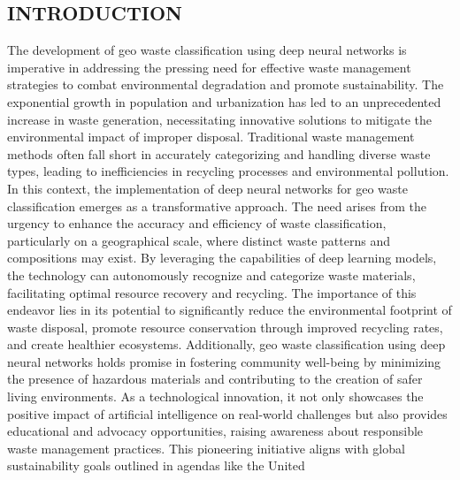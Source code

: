 \documentclass[12pt, English]{article}
\begin{document}
\newpage

\pagestyle{fancy}
\fancyfoot[R]{\footnotesize\thepage}

\begin{center}
\section{\Large INTRODUCTION}
\end{center}
\begin{normalsize}

The development of geo waste classification using deep neural networks is imperative in addressing the pressing need for effective waste management strategies
to combat environmental degradation and promote sustainability. The exponential growth in population and urbanization has led to an unprecedented increase in
waste generation, necessitating innovative solutions to mitigate the environmental
impact of improper disposal. Traditional waste management methods often fall
short in accurately categorizing and handling diverse waste types, leading to inefficiencies in recycling processes and environmental pollution. In this context, the
implementation of deep neural networks for geo waste classification emerges as
a transformative approach. The need arises from the urgency to enhance the accuracy and efficiency of waste classification, particularly on a geographical scale,
where distinct waste patterns and compositions may exist. By leveraging the capabilities of deep learning models, the technology can autonomously recognize
and categorize waste materials, facilitating optimal resource recovery and recycling. The importance of this endeavor lies in its potential to significantly reduce the environmental footprint of waste disposal, promote resource conservation through improved recycling rates, and create healthier ecosystems. Additionally, geo waste classification using deep neural networks holds promise in fostering community well-being by minimizing the presence of hazardous materials
and contributing to the creation of safer living environments. As a technological
innovation, it not only showcases the positive impact of artificial intelligence on
real-world challenges but also provides educational and advocacy opportunities,
raising awareness about responsible waste management practices. This pioneering
initiative aligns with global sustainability goals outlined in agendas like the United

\end{normalsize}
\end{document}
